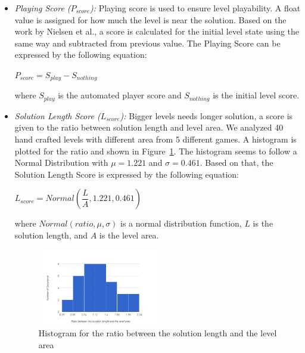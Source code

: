 \documentclass[letterpaper]{article}
\newcommand{\figref}[1]{Figure~\ref{Figure:#1}}
\begin{document}
\begin{itemize}
	\item \emph{Playing Score ($P_{score}$):} Playing score is used to ensure level playability. A float value is assigned for how much the level is near the solution. Based on the work by Nielsen et al.\cite{gvgpPerformanceProfiles}, a score is calculated for the initial level state using the same way and subtracted from previous value. The Playing Score can be expressed by the following equation:
	\begin{center}$ P_{score} = S_{play} - S_{nothing}$\end{center}
	where $S_{play}$ is the automated player score and $S_{nothing}$ is the initial level score.
	
	\item\emph{Solution Length Score ($L_{score}$):} Bigger levels needs longer solution, a score is given to the ratio between solution length and level area. We analyzed 40 hand crafted levels with different area from 5 different games. A histogram is plotted for the ratio and shown in \figref{solutionLengthHistogram}. The histogram seems to follow a Normal Distribution with $\mu = 1.221$ and $\sigma = 0.461$. Based on that, the Solution Length Score is expressed by the following equation:
	\begin{center}$L_{score} = Normal(\dfrac{L}{A}, 1.221, 0.461)$\end{center}
	where $Normal(ratio, \mu, \sigma)$ is a normal distribution function, $L$ is the solution length, and $A$ is the level area.
	\begin{figure}
		\centering
		\includegraphics[width=0.5\textwidth]{Images/solutionLengthHistogram}
		\caption{Histogram for the ratio between the solution length and the level area}
		\label{Figure:solutionLengthHistogram}
	\end{figure}
	

\end{itemize}
\end{document}
